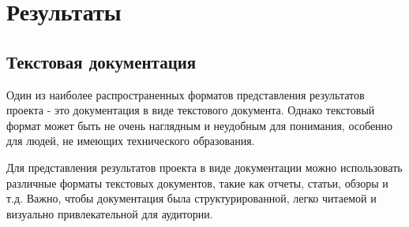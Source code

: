 \chapter{Результаты}
\label{ch:results}

    \section{Текстовая документация}
    Один из наиболее распространенных форматов представления результатов проекта - это документация в виде текстового документа. Однако текстовый формат может быть не очень наглядным и неудобным для понимания, особенно для людей, не имеющих технического образования.

    Для представления результатов проекта в виде документации можно использовать различные форматы текстовых документов, такие как отчеты, статьи, обзоры и т.д. Важно, чтобы документация была структурированной, легко читаемой и визуально привлекательной для аудитории.
    
